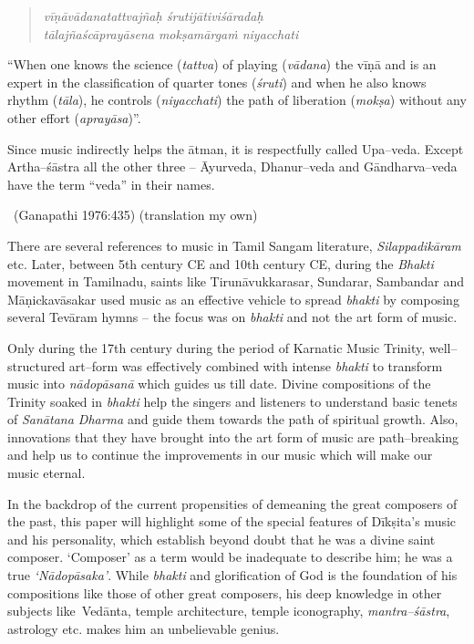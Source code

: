 \begin{verse}
\textit{vīṇāvādanatattvajñaḥ śrutijātiviśāradaḥ} \\\textit{tālajñaścāprayāsena mokṣamārgaṁ niyacchati} 
\end{verse}

“When one knows the science (\textit{tattva}) of playing (\textit{vādana}) the vīṇā and is an expert in the classification of quarter tones (\textit{śruti}) and when he also knows rhythm (\textit{tāla}), he controls (\textit{niyacchati}) the path of liberation (\textit{mokṣa}) without any other effort (\textit{aprayāsa})”.

\begin{myquote}
Since music indirectly helps the ātman, it is respectfully called Upa–veda. Except Artha–śāstra all the other three – Āyurveda, Dhanur–veda and Gāndharva–veda have the term “veda” in their names.
\end{myquote}


~\hfill (Ganapathi 1976:435) (translation my own)

There are several references to music in Tamil Sangam literature, \textit{Silappadikāram} etc. Later, between 5th century CE and 10th century CE, during the \textit{Bhakti} movement in Tamilnadu, saints like Tirunāvukkarasar, Sundarar, Sambandar and Māṇickavāsakar used music as an effective vehicle to spread \textit{bhakti} by composing several Tevāram hymns – the focus was on \textit{bhakti} and not the art form of music.

Only during the 17th century during the period of Karnatic Music Trinity, well–structured art–form was effectively combined with intense \textit{bhakti} to transform music into \textit{nādopāsanā} which guides us till date. Divine compositions of the Trinity soaked in \textit{bhakti} help the singers and listeners to understand basic tenets of \textit{Sanātana Dharma} and guide them towards the path of spiritual growth. Also, innovations that they have brought into the art form of music are path–breaking and help us to continue the improvements in our music which will make our music eternal.

In the backdrop of the current propensities of demeaning the great composers of the past, this paper will highlight some of the special features of Dīkṣita’s music and his personality, which establish beyond doubt that he was a divine saint composer. ‘Composer’ as a term would be inadequate to describe him; he was a true \textit{‘Nādopāsaka’}. While \textit{bhakti} and glorification of God is the foundation of his compositions like those of other great composers, his deep knowledge in other subjects like Vedānta, temple architecture, temple iconography, \textit{mantra–śāstra}, astrology etc. makes him an unbelievable genius.


